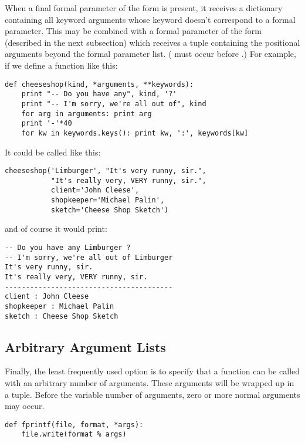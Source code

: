 \documentclass{manual}
\begin{document}
When a final formal parameter of the form  is
present, it receives a dictionary containing all keyword arguments
whose keyword doesn't correspond to a formal parameter.  This may be
combined with a formal parameter of the form
 (described in the next subsection) which receives a
tuple containing the positional arguments beyond the formal parameter
list.  ( must occur before .)
For example, if we define a function like this:

\begin{verbatim}
def cheeseshop(kind, *arguments, **keywords):
    print "-- Do you have any", kind, '?'
    print "-- I'm sorry, we're all out of", kind
    for arg in arguments: print arg
    print '-'*40
    for kw in keywords.keys(): print kw, ':', keywords[kw]
\end{verbatim}

It could be called like this:

\begin{verbatim}
cheeseshop('Limburger', "It's very runny, sir.",
           "It's really very, VERY runny, sir.",
           client='John Cleese',
           shopkeeper='Michael Palin',
           sketch='Cheese Shop Sketch')
\end{verbatim}

and of course it would print:

\begin{verbatim}
-- Do you have any Limburger ?
-- I'm sorry, we're all out of Limburger
It's very runny, sir.
It's really very, VERY runny, sir.
----------------------------------------
client : John Cleese
shopkeeper : Michael Palin
sketch : Cheese Shop Sketch
\end{verbatim}

\subsection{Arbitrary Argument Lists \label{arbitraryArgs}}

Finally, the least frequently used option is to specify that a
function can be called with an arbitrary number of arguments.  These
arguments will be wrapped up in a tuple.  Before the variable number
of arguments, zero or more normal arguments may occur.

\begin{verbatim}
def fprintf(file, format, *args):
    file.write(format % args)
\end{verbatim}
\end{document}
